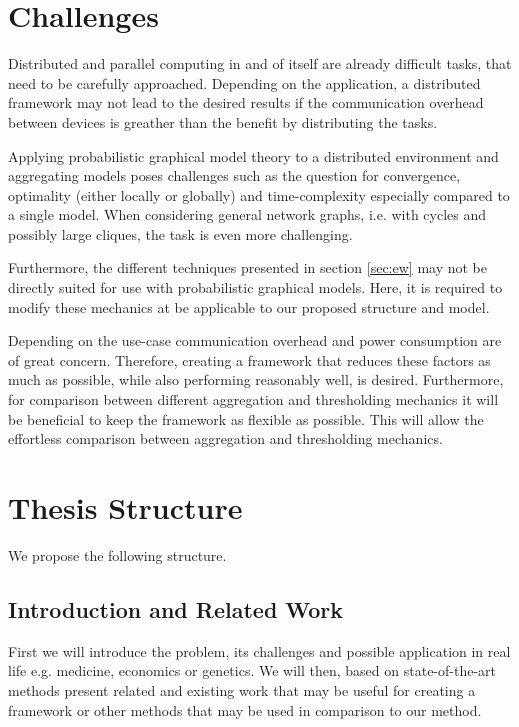    \section{Challenges}
  Distributed and parallel computing in and of itself are already difficult tasks, that need to be carefully approached.
  Depending on the application, a distributed framework may not lead to the desired results if the communication overhead between devices is greather than the benefit by distributing the tasks.

  Applying probabilistic graphical model theory to a distributed environment and aggregating models poses challenges such as the question for convergence, optimality (either locally or globally) and time-complexity especially compared to a single model.
  When considering general network graphs, i.e. with cycles and possibly large cliques, the task is even more challenging.

  Furthermore, the different techniques presented in section \ref{sec:ew} may not be directly suited for use with probabilistic graphical models.
  Here, it is required to modify these mechanics at be applicable to our proposed structure and model.

  Depending on the use-case communication overhead and power consumption are of great concern. 
  Therefore, creating a framework that reduces these factors as much as possible, while also performing reasonably well, is desired.
  Furthermore, for comparison between different aggregation and thresholding mechanics it will be beneficial to keep the framework as flexible as possible.
  This will allow the effortless comparison between aggregation and thresholding mechanics. 

   
  \section{Thesis Structure}
    We propose the following structure.
    
  \subsection{Introduction and Related Work}
    First we will introduce the problem, its challenges and possible application in real life e.g. medicine, economics or genetics. We will then, based on state-of-the-art methods present related and existing work that may be useful for creating a framework or other methods that may be used in comparison to our method.

